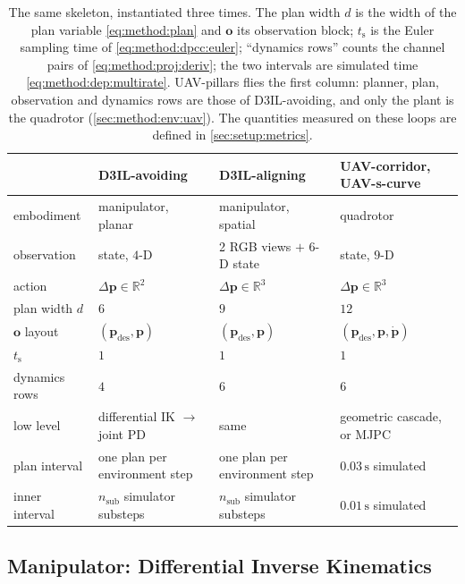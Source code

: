 \documentclass[headsepline,footsepline,footinclude=false,oneside,fontsize=11pt,paper=a4,listof=totoc,bibliography=totoc]{scrbook}
\theoremstyle{definition}
\theoremstyle{plain}
\theoremstyle{remark}
\newcommand{\vect}[1]{\boldsymbol{#1}}
\newcommand{\sidx}[1]{_{\textrm{#1}}}
\newcommand{\R}{\mathbb{R}}                    %
\begin{document}
\begin{table}[htpb]
  \caption[Embodiment instantiation]{The same skeleton, instantiated three times. The plan width $d$
  is the width of the plan variable \eqref{eq:method:plan} and $\vect{o}$ its observation block;
  $t\sidx{s}$ is the Euler sampling time of \eqref{eq:method:dpcc:euler}; ``dynamics rows'' counts the
  channel pairs of \eqref{eq:method:proj:deriv}; the two intervals are simulated time
  \eqref{eq:method:dep:multirate}. UAV-pillars flies the first column: planner, plan, observation and
  dynamics rows are those of D3IL-avoiding, and only the plant is the quadrotor
  (\autoref{sec:method:env:uav}). The quantities measured on these loops are defined in
  \autoref{sec:setup:metrics}.}
  \label{tab:embodiments}
  \centering\small
  \begin{tabularx}{\linewidth}{lLLL}
    \toprule
     & D3IL-avoiding & D3IL-aligning & UAV-corridor, UAV-s-curve \\
    \midrule
    embodiment      & manipulator, planar   & manipulator, spatial      & quadrotor \\
    observation     & state, $4$-D          & 2 RGB views $+$ $6$-D state & state, $9$-D \\
    action          & $\Delta\vect{p}\in\R^{2}$ & $\Delta\vect{p}\in\R^{3}$ & $\Delta\vect{p}\in\R^{3}$ \\
    plan width $d$  & $6$                   & $9$                       & $12$ \\
    $\vect{o}$ layout & $(\vect{p}\sidx{des},\vect{p})$ & $(\vect{p}\sidx{des},\vect{p})$ & $(\vect{p}\sidx{des},\vect{p},\dot{\vect{p}})$ \\
    $t\sidx{s}$     & $1$                   & $1$                       & $1$ \\
    dynamics rows   & $4$                   & $6$                       & $6$ \\
    low level       & differential \ac{IK} $\rightarrow$ joint PD & same & geometric cascade, or \ac{MJPC} \\
    plan interval   & one plan per environment step & one plan per environment step & $0.03\,\textrm{s}$ simulated \\
    inner interval  & $n\sidx{sub}$ simulator substeps & $n\sidx{sub}$ simulator substeps & $0.01\,\textrm{s}$ simulated \\
    \bottomrule
  \end{tabularx}
\end{table}

\subsection{Manipulator: Differential Inverse Kinematics}\label{sec:method:ik}
\end{document}
